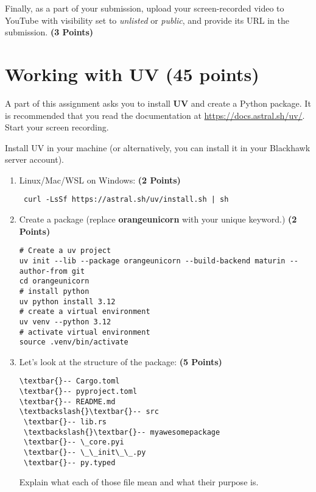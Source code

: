 \documentclass[12pt, xcolor=dvipsnames,svgnames,x11names]{article}
\begin{document}
Finally, as a part of your submission,  upload your screen-recorded video to YouTube with visibility set to \textit{unlisted} or \textit{public}, and provide its URL in the submission. \hfill \textbf{(3 Points)}




\section{Working with UV (45 points)}
A part of this assignment asks you to install \textbf{UV} and create a Python package. It is recommended that you read the documentation at \url{https://docs.astral.sh/uv/}. Start your screen recording.


Install UV in your machine (or alternatively, you can install it in your Blackhawk server account).
\begin{enumerate}
   \item Linux/Mac/WSL on Windows: \hfill \textbf{(2 Points)}
   \begin{verbatim}
 curl -LsSf https://astral.sh/uv/install.sh | sh
   \end{verbatim}

   \item Create a package (replace \textbf{orangeunicorn} with your unique keyword.) \hfill \textbf{(2 Points)}
   \begin{verbatim}
# Create a uv project
uv init --lib --package orangeunicorn --build-backend maturin --author-from git
cd orangeunicorn
# install python
uv python install 3.12
# create a virtual environment
uv venv --python 3.12
# activate virtual environment
source .venv/bin/activate
\end{verbatim}

\item Let's look at the structure of the package: \hfill \textbf{(5 Points)}

\begin{Verbatim}[commandchars=\\\{\}]
\textbar{}-- Cargo.toml
\textbar{}-- pyproject.toml
\textbar{}-- README.md
\textbackslash{}\textbar{}-- src
 \textbar{}-- lib.rs
 \textbackslash{}\textbar{}-- myawesomepackage
 \textbar{}-- \_core.pyi
 \textbar{}-- \_\_init\_\_.py
 \textbar{}-- py.typed
\end{Verbatim}

Explain what each of those file mean and what their purpose is.


\end{enumerate}
\end{document}
